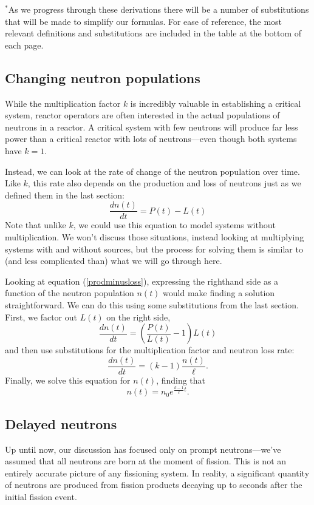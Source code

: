 \documentclass{report}
\begin{document}
$^*$As we progress through these derivations there will be a number of substitutions that will be made to simplify our formulas. For ease of reference, the most relevant definitions and substitutions are included in the table at the bottom of each page.

\newpage
\subsection*{Changing neutron populations}
While the multiplication factor $k$ is incredibly valuable in establishing a critical system, reactor operators are often interested in the actual populations of neutrons in a reactor. A critical system with few neutrons will produce far less power than a critical reactor with lots of neutrons---even though both systems have $k = 1$. 

Instead, we can look at the rate of change of the neutron population over time. Like $k$, this rate also depends on the production and loss of neutrons just as we defined them in the last section:
\begin{equation}\label{prodminusloss} \frac{dn(t)}{dt} = P(t) - L(t) \end{equation}
Note that unlike $k$, we could use this equation to model systems without multiplication. We won't discuss those situations, instead looking at multiplying systems with and without sources, but the process for solving them is similar to (and less complicated than) what we will go through here.

Looking at equation (\ref{prodminusloss}), expressing the righthand side as a function of the neutron population $n(t)$ would make finding a solution straightforward. We can do this using some substitutions from the last section. First, we factor out $L(t)$ on the right side,
$$ \frac{dn(t)}{dt} = \left( \frac{P(t)}{L(t)} - 1 \right) L(t) $$
and then use substitutions for the multiplication factor and neutron loss rate:
$$ \frac{dn(t)}{dt} = \left( k - 1 \right) \frac{n(t)}{\ell} .$$
Finally, we solve this equation for $n(t)$, finding that 
$$ n(t) = n_0 e^{\frac{k-1}{\ell}t} .$$

\subsection*{Delayed neutrons}
Up until now, our discussion has focused only on prompt neutrons---we've assumed that all neutrons are born at the moment of fission. This is not an entirely accurate picture of any fissioning system. In reality, a significant quantity of neutrons are produced from fission products decaying up to seconds after the initial fission event. 
\end{document}
